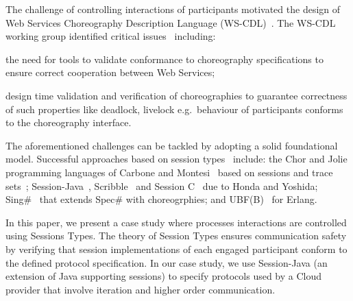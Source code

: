 \documentclass[10pt]{llncs}
\begin{document}

The challenge of controlling interactions of participants motivated the design of Web Services Choreography Description Language (WS-CDL)~\cite{session-types-sessions}.
The WS-CDL working group identified critical issues~\cite{ws-critical-overview} including:
\begin{compactenum}
	\item the need for tools to validate conformance to choreography specifications to ensure correct cooperation between Web Services;
	\item design time validation and verification of choreographies to guarantee correctness of such properties like deadlock, livelock e.g.\ behaviour of participants conforms to the choreography interface.
\end{compactenum}

The aforementioned challenges can be tackled by adopting a solid foundational model. Successful approaches based on session types~\cite{session-types-sessions,carbone2007structured} include: the Chor and Jolie programming languages of Carbone and Montesi~\cite{chor-lang,carbone2013deadlock} based on sessions and trace sets~\cite{chor-essence}; Session-Java~\cite{sj-lang}, Scribble~\cite{honda2011scribbling} and Session C~\cite{ng2012multiparty} due to Honda and Yoshida; Sing\#~\cite{basu2012deciding} that extends Spec\# with choreogrphies; and UBF(B)~\cite{armstrong2002getting} for Erlang.

In this paper, we present a case study where processes interactions are controlled using Sessions Types. The theory of Session Types ensures communication safety by verifying that session implementations of each engaged participant conform to the defined protocol specification. In our case study, we use Session-Java (an extension of Java supporting sessions) to specify protocols used by a Cloud provider that involve iteration and higher order communication.
\end{document}
